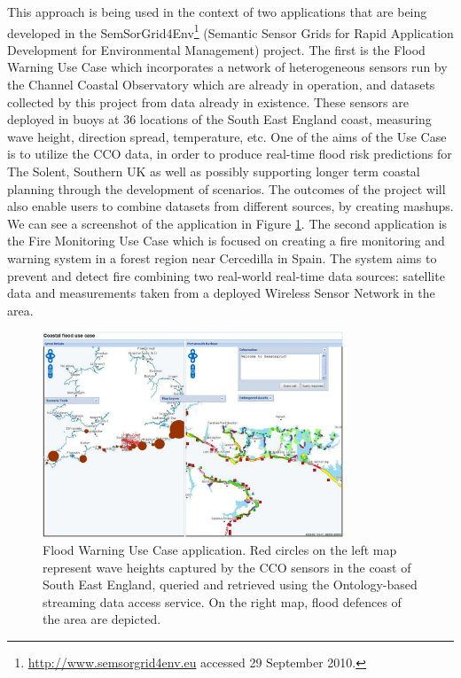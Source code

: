 This approach is being used in the context of two applications that are being developed in the SemSorGrid4Env\footnote{\url{http://www.semsorgrid4env.eu} accessed 29 September 2010.} (Semantic Sensor Grids for Rapid Application Development for Environmental Management) project. The first is the Flood Warning Use Case\cite{Hutton_10} which incorporates a network of heterogeneous sensors run by the Channel Coastal Observatory which are already in operation, and datasets collected by this project from data already in existence. These sensors are deployed in buoys at 36 locations of the South East England coast, measuring wave height, direction spread, temperature, etc. One of the aims of the Use Case is to utilize the CCO data, in order to produce real-time flood risk predictions for The Solent, Southern UK as well as possibly supporting longer term coastal planning through the development of scenarios. The outcomes of the project will also enable users to combine datasets from different sources, by creating mashups. We can see a screenshot of the application in Figure \ref{fig:floodap}.
The second application is the Fire Monitoring Use Case\cite{Guillen_10} which is focused on creating a  fire monitoring and warning system in a forest region near Cercedilla in Spain.
The system aims to prevent and detect fire combining two real-world real-time data sources: satellite data and measurements taken from a deployed Wireless Sensor Network in the area.  

\begin{figure}[t]
  \centering
  \includegraphics[width=0.8\textwidth]{img/floodapp}
  \caption{Flood Warning Use Case application. Red circles on the left map represent wave heights captured by the CCO sensors in the coast of South East England, queried and retrieved using the Ontology-based streaming data access service. On the right map, flood defences of the area are depicted.}
  \label{fig:floodap}
\end{figure}

